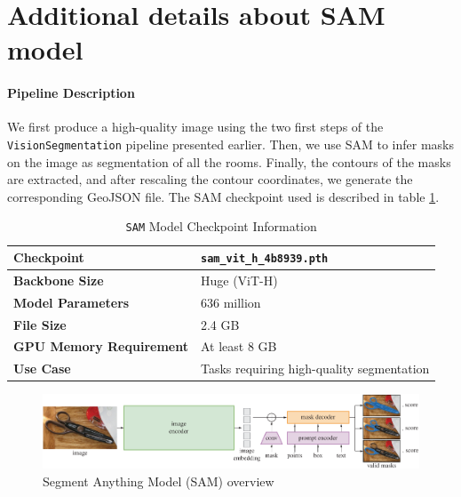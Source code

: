 \documentclass[11pt]{article}
\begin{document}

\section{Additional details about SAM model}
\label{app:sec:SAMdetails}

\paragraph{Pipeline Description} 
We first produce a high-quality image using the 
two first steps of the \texttt{VisionSegmentation} pipeline presented earlier.
Then, we use SAM to infer masks on 
the image as segmentation of all the rooms. Finally, the contours of the masks 
are extracted, and after rescaling the contour coordinates, we generate the 
corresponding GeoJSON file. The SAM checkpoint used is described in table
\ref{tab:SAM_model_checkpoint}.

\begin{table}[htb!]
    \centering
    \begin{tabular}{|l|l|}
        \hline
        \textbf{Checkpoint} & \texttt{sam\_vit\_h\_4b8939.pth} \\ \hline
        \textbf{Backbone Size} & Huge (ViT-H) \\ \hline
        \textbf{Model Parameters} & 636 million \\ \hline
        \textbf{File Size} & 2.4 GB \\ \hline
        \textbf{GPU Memory Requirement} & At least 8 GB \\ \hline
        \textbf{Use Case} & Tasks requiring high-quality segmentation \\ \hline
    \end{tabular}
    \caption{\texttt{SAM} Model Checkpoint Information}
    \label{tab:SAM_model_checkpoint}
\end{table}


\begin{figure}[htb!]
    \centering
    \includegraphics[width=0.9\linewidth]{figures/SAM_model_diagram.pdf}
    \caption{Segment Anything Model (SAM) overview}
    \label{fig:SAMmodel_diagram}
\end{figure}
\end{document}
